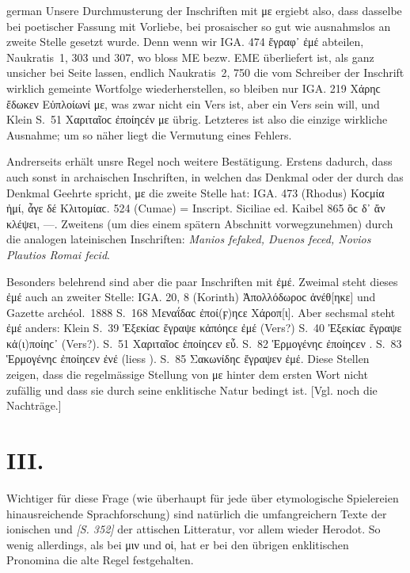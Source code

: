 \begin{otherlanguage*}{german}
Unsere Durchmusterung der Inschriften mit με ergiebt also, dass dasselbe bei poetischer Fassung mit Vorliebe, bei prosaischer so gut wie ausnahmslos an zweite Stelle gesetzt wurde. Denn wenn wir IGA. 474 ἔγραφ᾽ ἐμέ abteilen, Naukratis~1, 303 und 307, wo bloss ΜΕ bezw. ΕΜΕ überliefert ist, als ganz unsicher bei Seite lassen, endlich Naukratis~2, 750 die vom Schreiber der Inschrift wirklich gemeinte Wortfolge wiederherstellen, so bleiben nur IGA. 219 Χάρηϲ ἔδωκεν Εὐπλοίωνί με, was zwar nicht ein Vers ist, aber ein Vers sein will, und Klein S.~51 Χαριταῖοϲ ἐποίηϲέν με übrig. Letzteres ist also die einzige wirkliche Ausnahme; um so näher liegt die Vermutung eines Fehlers.

Andrerseits erhält unsre Regel noch weitere Bestätigung. Erstens dadurch, dass auch sonst in archaischen Inschriften, in welchen das Denkmal oder der durch das Denkmal Geehrte spricht, με die zweite Stelle hat: IGA. 473 (Rhodus) Κοϲμία ἠμί, ἆγε δέ  Κλιτομίαϲ. 524 (Cumae) = Inscript. Siciliae ed. Kaibel 865 ὃϲ δ᾽ ἄν  κλέψει, —. Zweitens (um dies einem spätern Abschnitt vorwegzunehmen) durch die analogen lateinischen Inschriften: \emph{Manios  fefaked, Duenos  feced, Novios Plautios  Romai fecid}.

Besonders belehrend sind aber die paar Inschriften mit ἐμέ. Zweimal steht dieses ἐμέ auch an zweiter Stelle: IGA. 20, 8 (Korinth) Ἀπολλόδωροϲ  ἀνέθ[ηκε] und Gazette archéol.~1888 S.~168 Μεναΐδαϲ  ἐποί(ϝ)ηϲε Χάροπ[ι]. Aber sechsmal steht ἐμέ anders: Klein S.~39 Ἐξεκίαϲ ἔγραψε κἀπόηϲε ἐμέ (Vers?) S.~40 Ἐξεκίαϲ ἔγραψε κἀ(ι)ποίηϲ᾽  (Vers?). S.~51 Χαριταῖοϲ ἐποίηϲεν  εὖ. S.~82 Ἑρμογένηϲ ἐποίηϲεν . S.~83 Ἑρμογένηϲ ἐποίηϲεν ἐνέ (liess ). S.~85 Σακω\-νίδηϲ ἔγραψεν ἐμέ. Diese Stellen zeigen, dass die regelmässige Stellung von με hinter dem ersten Wort nicht zufällig und dass sie durch seine enklitische Natur bedingt ist. [Vgl. noch die Nachträge.]

\section*{III.}

Wichtiger für diese Frage (wie überhaupt für jede über etymologische Spielereien hinausreichende Sprachforschung) sind natürlich die umfangreichern Texte der ionischen und \hypertarget{p352}{\emph{[S. 352]}}\label{p352} der attischen Litteratur, vor allem wieder Herodot. So wenig allerdings, als bei μιν und οἱ, hat er bei den übrigen enklitischen Pronomina die alte Regel festgehalten.


\end{otherlanguage*}
